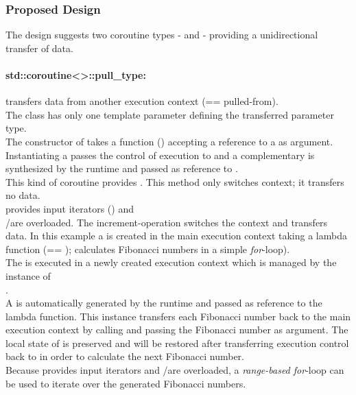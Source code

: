 
\subsubsection*{Proposed Design}
The design suggests two coroutine types - \pushcoro and \pullcoro - providing a
unidirectional transfer of data.

\paragraph*{std::coroutine<>::pull\_type:}
transfers data from another execution context (== pulled-from).\\
The class has only one template parameter defining the transferred parameter
type.\\
The constructor of \pullcoro takes a function (\corofunction) accepting a
reference to a \pushcoro as argument. Instantiating a \pullcoro passes the
control of execution to \corofunction and a complementary \pushcoro is
synthesized by the runtime and passed as reference to \corofunction.\\
\newline
This kind of coroutine provides \pullcoroop. This method only switches
context; it transfers no data.\\
\newline
\pullcoro provides input iterators (\pullcoroiterator) and\\
\bgin/\ed are overloaded. The increment-operation switches the context and
transfers data.
In this example a \pullcoro is created in the main execution context taking a
lambda function (== \corofunction); calculates Fibonacci numbers in a simple
\textit{for}-loop).\\
The \corofunction is executed in a newly created execution context which is
managed by the instance of\\
\pullcoro.\\
A \pushcoro is automatically generated by the runtime and passed as reference
to the lambda function. This \pushcoro instance transfers each Fibonacci number
back to the main execution context by calling \pushcoroop and passing the
Fibonacci number as argument. The local state of \corofunction is preserved and
will be restored after transferring execution control back to \corofunction in
order to calculate the next Fibonacci number.\\
Because \pullcoro provides input iterators and \bgin/\ed are overloaded, a
\textit{range-based for}-loop can be used to iterate over the generated
Fibonacci numbers.

